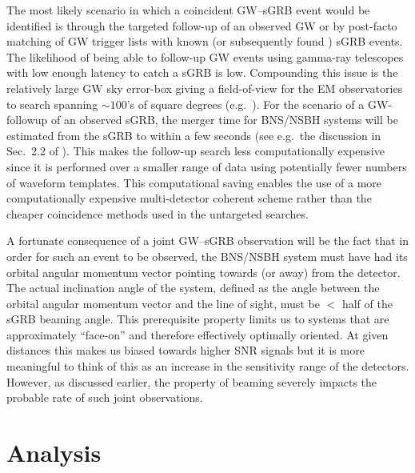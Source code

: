 \documentclass[prd, twocolumn, lengthcheck, superscriptaddress, showpacs, letterpaper, nofootinbib]{revtex4-1}
\begin{document}
The most likely scenario in which a coincident \ac{GW}--\ac{sGRB} event would
be identified is through the targeted follow-up of an observed \ac{GW} or by
post-facto matching of \ac{GW} trigger lists with known (or subsequently found
\cite{2015ApJS..217....8B}) \ac{sGRB} events.  The likelihood of being able to
follow-up \ac{GW} events using gamma-ray telescopes with low enough latency to
catch a \ac{sGRB} is low.  Compounding this issue is the relatively large
\ac{GW} sky error-box giving a field-of-view for the \ac{EM} observatories to
search spanning $\sim 100$'s of square degrees (e.g.\
\cite{2011CQGra..28j5021F,2013arXiv1304.0670L,2014ApJ...795..105S}).
For the scenario of a \ac{GW}-followup of an observed \ac{sGRB}, the
merger time for \ac{BNS}/\ac{NSBH} systems will be estimated from the \ac{sGRB}
to within a few seconds (see e.g.\ the discussion in Sec.\ 2.2 of
\cite{2012ApJ...760...12A}). This makes the follow-up search less
computationally expensive since it is performed over a
smaller range of data using potentially fewer numbers of waveform templates.
This computational saving enables the use of a more computationally expensive
multi-detector coherent scheme rather than the cheaper coincidence methods used
in the untargeted searches. 

A fortunate consequence of a joint \ac{GW}--\ac{sGRB} observation will be the
fact that in order for such an event to be observed, the \ac{BNS}/\ac{NSBH}
system must have had its orbital angular momentum vector pointing towards (or
away) from the detector.  The actual inclination angle of the system, defined
as the angle between the orbital angular momentum vector and the line of sight,
must be $<$ half of the \ac{sGRB} beaming angle.  This prerequisite property
limits us to systems that are approximately ``face-on'' and therefore
effectively optimally oriented. At given distances this makes us biased towards higher
\ac{SNR} signals but it is more meaningful to think of this as an increase in
the sensitivity range of the detectors. However, as discussed earlier, the
property of beaming severely impacts the probable rate of such joint
observations.   


\section{Analysis}\label{sec:analysis}
\end{document}
